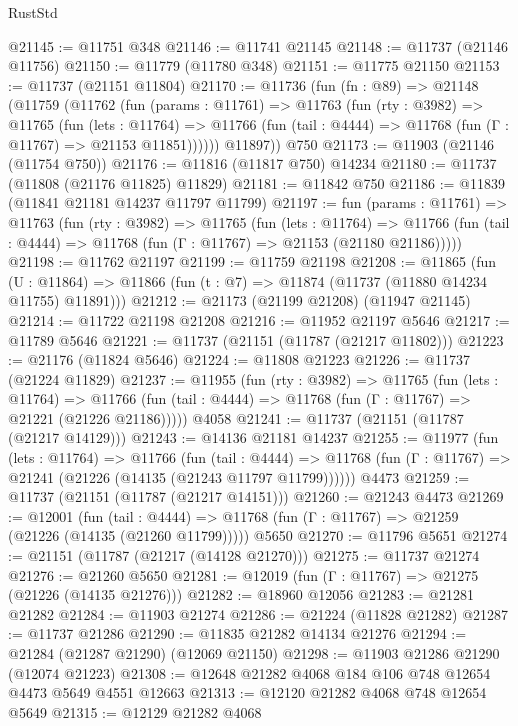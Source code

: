 \begin{lexlean}{RustStd}
\begin{coremodule}
@21145 := @11751 @348
@21146 := @11741 @21145
@21148 := @11737 (@21146 @11756)
@21150 := @11779 (@11780 @348)
@21151 := @11775 @21150
@21153 := @11737 (@21151 @11804)
@21170 := @11736
    (fun (fn : @89) =>
    @21148
      (@11759
        (@11762
          (fun (params : @11761) =>
          @11763
            (fun (rty : @3982) =>
            @11765
              (fun (lets : @11764) =>
              @11766 (fun (tail : @4444) => @11768 (fun (Γ : @11767) => @21153 @11851))))))
        @11897))
    @750
@21173 := @11903 (@21146 (@11754 @750))
@21176 := @11816 (@11817 @750) @14234
@21180 := @11737 (@11808 (@21176 @11825) @11829)
@21181 := @11842 @750
@21186 := @11839 (@11841 @21181 @14237 @11797 @11799)
@21197 := fun (params : @11761) =>
  @11763
    (fun (rty : @3982) =>
    @11765
      (fun (lets : @11764) =>
      @11766 (fun (tail : @4444) => @11768 (fun (Γ : @11767) => @21153 (@21180 @21186)))))
@21198 := @11762 @21197
@21199 := @11759 @21198
@21208 := @11865
    (fun (U : @11864) => @11866 (fun (t : @7) => @11874 (@11737 (@11880 @14234 @11755) @11891)))
@21212 := @21173 (@21199 @21208) (@11947 @21145)
@21214 := @11722 @21198 @21208
@21216 := @11952 @21197 @5646
@21217 := @11789 @5646
@21221 := @11737 (@21151 (@11787 (@21217 @11802)))
@21223 := @21176 (@11824 @5646)
@21224 := @11808 @21223
@21226 := @11737 (@21224 @11829)
@21237 := @11955
    (fun (rty : @3982) =>
    @11765
      (fun (lets : @11764) =>
      @11766 (fun (tail : @4444) => @11768 (fun (Γ : @11767) => @21221 (@21226 @21186)))))
    @4058
@21241 := @11737 (@21151 (@11787 (@21217 @14129)))
@21243 := @14136 @21181 @14237
@21255 := @11977
    (fun (lets : @11764) =>
    @11766
      (fun (tail : @4444) =>
      @11768 (fun (Γ : @11767) => @21241 (@21226 (@14135 (@21243 @11797 @11799))))))
    @4473
@21259 := @11737 (@21151 (@11787 (@21217 @14151)))
@21260 := @21243 @4473
@21269 := @12001
    (fun (tail : @4444) => @11768 (fun (Γ : @11767) => @21259 (@21226 (@14135 (@21260 @11799)))))
    @5650
@21270 := @11796 @5651
@21274 := @21151 (@11787 (@21217 (@14128 @21270)))
@21275 := @11737 @21274
@21276 := @21260 @5650
@21281 := @12019 (fun (Γ : @11767) => @21275 (@21226 (@14135 @21276)))
@21282 := @18960 @12056
@21283 := @21281 @21282
@21284 := @11903 @21274
@21286 := @21224 (@11828 @21282)
@21287 := @11737 @21286
@21290 := @11835 @21282 @14134 @21276
@21294 := @21284 (@21287 @21290) (@12069 @21150)
@21298 := @11903 @21286 @21290 (@12074 @21223)
@21308 := @12648 @21282 @4068 @184 @106 @748 @12654 @4473 @5649 @4551 @12663
@21313 := @12120 @21282 @4068 @748 @12654 @5649
@21315 := @12129 @21282 @4068

\end{coremodule}
\end{lexlean}

